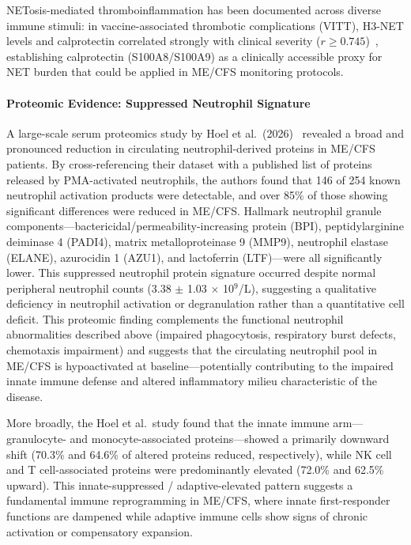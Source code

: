 NETosis-mediated thromboinflammation has been documented across diverse immune stimuli: in vaccine-associated thrombotic complications (VITT), H3-NET levels and calprotectin correlated strongly with clinical severity ($r \geq 0.745$)~\cite{Hetland2022}, establishing calprotectin (S100A8/S100A9) as a clinically accessible proxy for NET burden that could be applied in ME/CFS monitoring protocols.

\paragraph{Proteomic Evidence: Suppressed Neutrophil Signature}
A large-scale serum proteomics study by Hoel et al.\ (2026)~\cite{Hoel2026proteome} revealed a broad and pronounced reduction in circulating neutrophil-derived proteins in ME/CFS patients. By cross-referencing their dataset with a published list of proteins released by PMA-activated neutrophils, the authors found that 146 of 254 known neutrophil activation products were detectable, and over 85\% of those showing significant differences were reduced in ME/CFS. Hallmark neutrophil granule components---bactericidal/permeability-increasing protein (BPI), peptidylarginine deiminase 4 (PADI4), matrix metalloproteinase 9 (MMP9), neutrophil elastase (ELANE), azurocidin 1 (AZU1), and lactoferrin (LTF)---were all significantly lower. This suppressed neutrophil protein signature occurred despite normal peripheral neutrophil counts (3.38 $\pm$ 1.03 $\times$ 10$^9$/L), suggesting a qualitative deficiency in neutrophil activation or degranulation rather than a quantitative cell deficit. This proteomic finding complements the functional neutrophil abnormalities described above (impaired phagocytosis, respiratory burst defects, chemotaxis impairment) and suggests that the circulating neutrophil pool in ME/CFS is hypoactivated at baseline---potentially contributing to the impaired innate immune defense and altered inflammatory milieu characteristic of the disease.

More broadly, the Hoel et al.\ study found that the innate immune arm---granulocyte- and monocyte-associated proteins---showed a primarily downward shift (70.3\% and 64.6\% of altered proteins reduced, respectively), while NK cell and T cell-associated proteins were predominantly elevated (72.0\% and 62.5\% upward). This innate-suppressed / adaptive-elevated pattern suggests a fundamental immune reprogramming in ME/CFS, where innate first-responder functions are dampened while adaptive immune cells show signs of chronic activation or compensatory expansion.

